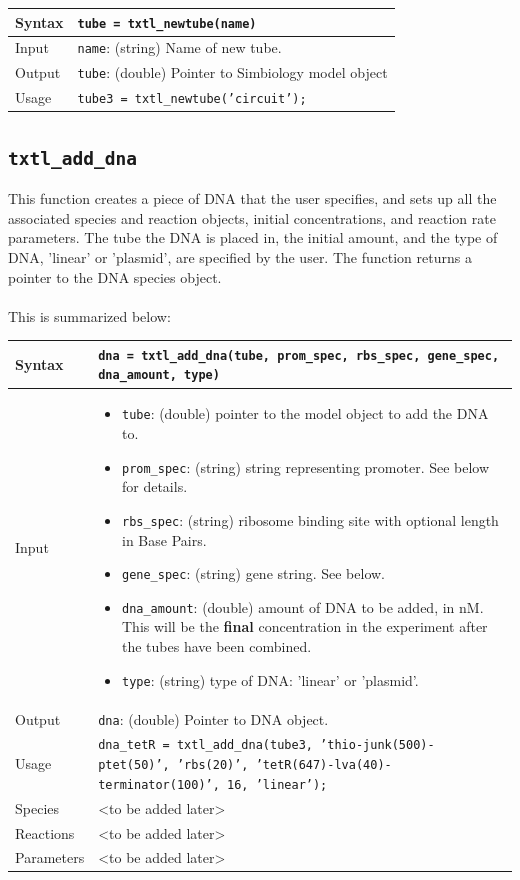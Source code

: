 \documentclass[english]{report}
\begin{document}
			\begin{tabular}{p{2cm}|p{13cm}}
			Syntax & \texttt{tube = txtl\_newtube(name)}\\ \hline
			Input & \texttt{name}: (string) Name of new tube. \\ \hline
			Output & \texttt{tube}: (double) Pointer to Simbiology model object\\ \hline
			Usage & \texttt{tube3 = txtl\_newtube('circuit');}\\
			\end{tabular}	

		\subsection*{\texttt{txtl\_add\_dna}}
			This function creates a piece of DNA that the user specifies, and sets up all the associated species and reaction objects, initial concentrations, and reaction rate parameters. The tube the DNA is placed in, the initial amount, and the type of DNA, 'linear' or 'plasmid', are specified by the user. The function returns a pointer to the DNA species object. \\ 
			\\
			This is summarized below:	
			
			\begin{tabular}{p{2cm}|p{13cm}}
			Syntax & \texttt{dna = txtl\_add\_dna(tube, prom\_spec, rbs\_spec, gene\_spec, dna\_amount, type)}\\ \hline
			Input &  \begin{itemize}
				\item \texttt{tube}: (double) pointer to the model object to add the DNA to.
				\item \texttt{prom\_spec}: (string) string representing promoter. See below for details. 
				\item \texttt{rbs\_spec}: (string) ribosome binding site with optional length in Base Pairs.
				\item \texttt{gene\_spec}: (string) gene string. See below.
				\item \texttt{dna\_amount}: (double) amount of DNA to be added, in nM. This will be the \textbf{final} concentration in the experiment after the tubes have been combined. 
				\item \texttt{type}: (string) type of DNA: 'linear' or 'plasmid'. 
				\end{itemize} \\ \hline
			Output & \texttt{dna}: (double) Pointer to DNA object. \\ \hline
			Usage & \texttt{dna\_tetR = txtl\_add\_dna(tube3, 'thio-junk(500)-ptet(50)', 'rbs(20)', 'tetR(647)-lva(40)-terminator(100)', 16, 'linear');}\\ \hline
			Species & {\color{red}<to be added later>}\\ \hline
			Reactions & {\color{red}<to be added later>}\\ \hline
			Parameters & {\color{red}<to be added later>}\\
			\end{tabular}	
			
\end{document}
